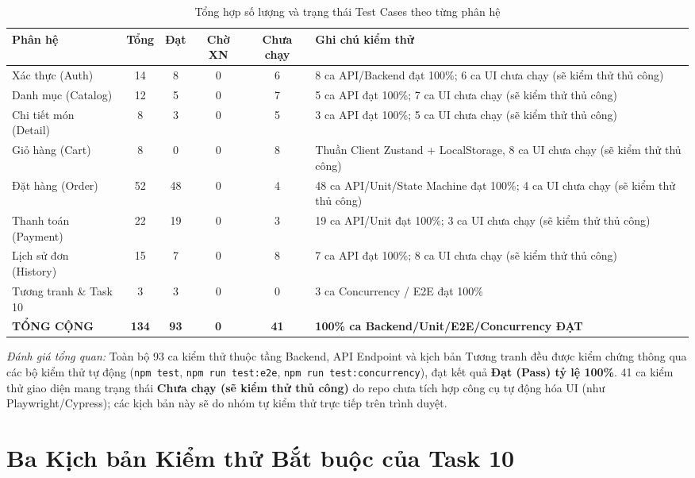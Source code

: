 \documentclass[12pt,a4paper,oneside]{report}
\begin{document}
\begin{table}[H]
\centering
\small
\caption{Tổng hợp số lượng và trạng thái Test Cases theo từng phân hệ}
\label{tab:test-summary-by-module}
\begin{tabularx}{\textwidth}{p{2.6cm}ccccX}
\toprule
\textbf{Phân hệ} & \textbf{Tổng} & \textbf{Đạt} & \textbf{Chờ XN} & \textbf{Chưa chạy} & \textbf{Ghi chú kiểm thử} \\
\midrule
Xác thực (Auth) & 14 & 8 & 0 & 6 & 8 ca API/Backend đạt 100\%; 6 ca UI chưa chạy (sẽ kiểm thử thủ công) \\
Danh mục (Catalog) & 12 & 5 & 0 & 7 & 5 ca API đạt 100\%; 7 ca UI chưa chạy (sẽ kiểm thử thủ công) \\
Chi tiết món (Detail) & 8 & 3 & 0 & 5 & 3 ca API đạt 100\%; 5 ca UI chưa chạy (sẽ kiểm thử thủ công) \\
Giỏ hàng (Cart) & 8 & 0 & 0 & 8 & Thuần Client Zustand + LocalStorage, 8 ca UI chưa chạy (sẽ kiểm thử thủ công) \\
Đặt hàng (Order) & 52 & 48 & 0 & 4 & 48 ca API/Unit/State Machine đạt 100\%; 4 ca UI chưa chạy (sẽ kiểm thử thủ công) \\
Thanh toán (Payment) & 22 & 19 & 0 & 3 & 19 ca API/Unit đạt 100\%; 3 ca UI chưa chạy (sẽ kiểm thử thủ công) \\
Lịch sử đơn (History) & 15 & 7 & 0 & 8 & 7 ca API đạt 100\%; 8 ca UI chưa chạy (sẽ kiểm thử thủ công) \\
Tương tranh \& Task 10 & 3 & 3 & 0 & 0 & 3 ca Concurrency / E2E đạt 100\% \\
\midrule
\textbf{TỔNG CỘNG} & \textbf{134} & \textbf{93} & \textbf{0} & \textbf{41} & \textbf{100\% ca Backend/Unit/E2E/Concurrency ĐẠT} \\
\bottomrule
\end{tabularx}
\end{table}

\noindent\textit{Đánh giá tổng quan:} Toàn bộ 93 ca kiểm thử thuộc tầng Backend, API Endpoint và kịch bản Tương tranh đều được kiểm chứng thông qua các bộ kiểm thử tự động (\texttt{npm test}, \texttt{npm run test:e2e}, \texttt{npm run test:concurrency}), đạt kết quả \textbf{Đạt (Pass) tỷ lệ 100\%}. 41 ca kiểm thử giao diện mang trạng thái \textbf{Chưa chạy (sẽ kiểm thử thủ công)} do repo chưa tích hợp công cụ tự động hóa UI (như Playwright/Cypress); các kịch bản này sẽ do nhóm tự kiểm thử trực tiếp trên trình duyệt.

\section{Ba Kịch bản Kiểm thử Bắt buộc của Task 10}
\end{document}
